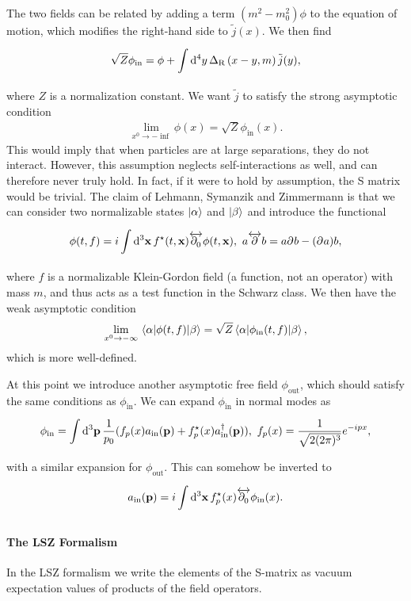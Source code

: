 The two fields can be related by adding a term $(m^{2} - m_{0}^{2})\phi$ to the equation of motion, which modifies the right-hand side to $\tilde{j}(x)$. We then find
\begin{align*}
	\sqrt{Z}\phi_{\text{in}} = \phi + \int\limits_{}^{}\dd[4]{y}\Delta_{\text{R}}\left(x - y, m\right)\tilde{j}(y),
\end{align*}
where $Z$ is a normalization constant. We want $\tilde{j}$ to satisfy the strong asymptotic condition
\begin{align*}
	\lim\limits_{x^{0}\to -\inf}\phi(x) = \sqrt{Z}\phi_{\text{in}}(x).
\end{align*}
This would imply that when particles are at large separations, they do not interact. However, this assumption neglects self-interactions as well, and can therefore never truly hold. In fact, if it were to hold by assumption, the S matrix would be trivial. The claim of Lehmann, Symanzik and Zimmermann is that we can consider two normalizable states $\ket{\alpha}$ and $\ket{\beta}$ and introduce the functional
\begin{align*}
	\phi(t, f) = i\int\limits_{}^{}\dd[3]{\vb{x}}f^{\star}(t, \vb{x})\overleftrightarrow{\partial^{}_{0}}\phi(t, \vb{x}),\ a\overleftrightarrow{\partial^{}_{}}b = a\partial^{}_{}b - (\partial^{}_{}a)b,
\end{align*}
where $f$ is a normalizable Klein-Gordon field (a function, not an operator) with mass $m$, and thus acts as a test function in the Schwarz class. We then have the weak asymptotic condition
\begin{align*}
	\lim\limits_{x^{0} \to -\infty}\mel{\alpha}{\phi(t, f)}{\beta} = \sqrt{Z}\mel{\alpha}{\phi_{\text{in}}(t, f)}{\beta},
\end{align*}
which is more well-defined.

At this point we introduce another asymptotic free field $\phi_{\text{out}}$, which should satisfy the same conditions as $\phi_{\text{in}}$. We can expand $\phi_{\text{in}}$ in normal modes as
\begin{align*}
	\phi_{\text{in}} = \int\limits_{}^{}\dd[3]{\vb{p}}\frac{1}{p_{0}}(f_{p}(x)a_{\text{in}}(\vb{p}) + f_{p}^{\star}(x)a_{\text{in}}^{\dagger}(\vb{p})),\ f_{p}(x) = \frac{1}{\sqrt{2(2\pi)^{3}}}e^{-ipx},
\end{align*}
with a similar expansion for $\phi_{\text{out}}$. This can somehow be inverted to
\begin{align*}
	a_{\text{in}}(\vb{p}) = i\int\limits_{}^{}\dd[3]{\vb{x}}f_{p}^{\star}(x)\overleftrightarrow{\partial^{}_{0}}\phi_{\text{in}}(x).
\end{align*}

\paragraph{The LSZ Formalism}
In the LSZ formalism we write the elements of the S-matrix as vacuum expectation values of products of the field operators.

